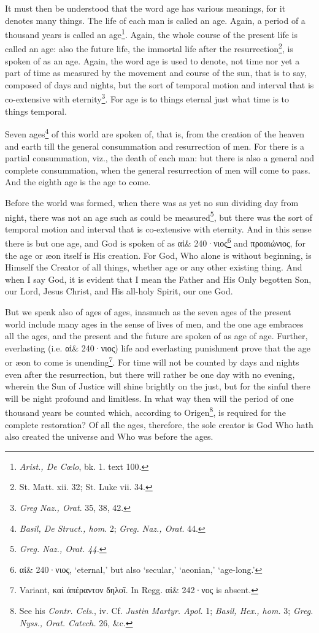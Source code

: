 It must then be understood that the word age has various meanings, for it denotes many things. The life of each man is called an age. Again, a period of a thousand years is called an age\footnote{\emph{Arist., De Cœlo}, bk. 1. text 100.}. Again, the whole course of the present life is called an age: also the future life, the immortal life after the resurrection\footnote{St. Matt. xii. 32; St. Luke vii. 34.}, is spoken of as an age. Again, the word age is used to denote, not time nor yet a part of time as measured by the movement and course of the sun, that is to say, composed of days and nights, but the sort of temporal motion and interval that is co-extensive with eternity\footnote{\emph{Greg Naz., Orat}. 35, 38, 42.}. For age is to things eternal just what time is to things temporal.

Seven ages\footnote{\emph{Basil, De Struct., hom}. 2; \emph{Greg. Naz., Orat}. 44.} of this world are spoken of, that is, from the creation of the heaven and earth till the general consummation and resurrection of men. For there is a partial consummation, viz., the death of each man: but there is also a general and complete consummation, when the general resurrection of men will come to pass. And the eighth age is the age to come.

Before the world was formed, when there was as yet no sun dividing day from night, there was not an age such as could be measured\footnote{\emph{Greg. Naz., Orat. 44.}}, but there was the sort of temporal motion and interval that is co-extensive with eternity. And in this sense there is but one age, and God is spoken of as \textgreek{αἰ\& 240·νιος}\footnote{\textgreek{αἰ\& 240·νιος}, ‘eternal,’ but also ‘secular,’ ‘aeonian,’ ‘age-long.’} and \textgreek{προαιώνιος}, for the age or æon itself is His creation. For God, Who alone is without beginning, is Himself the Creator of all things, whether age or any other existing thing. And when I say God, it is evident that I mean the Father and His Only begotten Son, our Lord, Jesus Christ, and His all-holy Spirit, our one God.

But we speak also of ages of ages, inasmuch as the seven ages of the present world include many ages in the sense of lives of men, and the one age embraces all the ages, and the present and the future are spoken of as age of age. Further, everlasting (i.e. \textgreek{αἰ\& 240·νιος}) life and everlasting punishment prove that the age or æon to come is unending\footnote{Variant, \textgreek{καὶ ἀπέραντον δηλοῖ}. In Regg. \textgreek{αἰ\& 242·νος} is absent.}. For time will not be counted by days and nights even after the resurrection, but there will rather be one day with no evening, wherein the Sun of Justice will shine brightly on the just, but for the sinful there will be night profound and limitless. In what way then will the period of one thousand years be counted which, according to Origen\footnote{See his \emph{Contr. Cels}., iv. Cf. \emph{Justin Martyr. Apol. }1; \emph{Basil, Hex., hom. }3; \emph{Greg. Nyss., Orat. Catech. }26, \&c.}, is required for the complete restoration? Of all the ages, therefore, the sole creator is God Who hath also created the universe and Who was before the ages.

